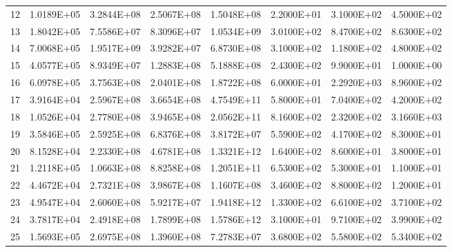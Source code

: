 \documentclass[11pt]{scrartcl}
\theoremstyle{dotlessP}
\theoremstyle{dotlessN}
\theoremstyle{dotN}
\begin{document}
\begin{table}[H]
{\begin{tabular}{c|c|c|c|c|c|c|c}
12            & 1.0189E+05  & 3.2844E+08      & 2.5067E+08    & 1.5048E+08          & 2.2000E+01         & 3.1000E+02       & 4.5000E+02             \\
13            & 1.8042E+05  & 7.5586E+07      & 8.3096E+07    & 1.0534E+09          & 3.0100E+02         & 8.4700E+02       & 8.6300E+02             \\
14            & 7.0068E+05  & 1.9517E+09      & 3.9282E+07    & 6.8730E+08          & 3.1000E+02         & 1.1800E+02       & 4.8000E+02             \\
15            & 4.0577E+05  & 8.9349E+07      & 1.2883E+08    & 5.1888E+08          & 2.4300E+02         & 9.9000E+01       & 1.0000E+00             \\
16            & 6.0978E+05  & 3.7563E+08      & 2.0401E+08    & 1.8722E+08          & 6.0000E+01         & 2.2920E+03       & 8.9600E+02             \\
17            & 3.9164E+04  & 2.5967E+08      & 3.6654E+08    & 4.7549E+11          & 5.8000E+01         & 7.0400E+02       & 4.2000E+02             \\
18            & 1.0526E+04  & 2.7780E+08      & 3.9465E+08    & 2.0562E+11          & 8.1600E+02         & 2.3200E+02       & 3.1660E+03             \\
19            & 3.5846E+05  & 2.5925E+08      & 6.8376E+08    & 3.8172E+07          & 5.5900E+02         & 4.1700E+02       & 8.3000E+01             \\
20            & 8.1528E+04  & 2.2330E+08      & 4.6781E+08    & 1.3321E+12          & 1.6400E+02         & 8.6000E+01       & 3.8000E+01             \\
21            & 1.2118E+05  & 1.0663E+08      & 8.8258E+08    & 1.2051E+11          & 6.5300E+02         & 5.3000E+01       & 1.1000E+01             \\
22            & 4.4672E+04  & 2.7321E+08      & 3.9867E+08    & 1.1607E+08          & 3.4600E+02         & 8.8000E+02       & 1.2000E+01             \\
23            & 4.9547E+04  & 2.6060E+08      & 5.9217E+07    & 1.9418E+12          & 1.3300E+02         & 6.6100E+02       & 3.7100E+02             \\
24            & 3.7817E+04  & 2.4918E+08      & 1.7899E+08    & 1.5786E+12          & 3.1000E+01         & 9.7100E+02       & 3.9900E+02             \\
25            & 1.5693E+05  & 2.6975E+08      & 1.3960E+08    & 7.2783E+07          & 3.6800E+02         & 5.5800E+02       & 5.3400E+02             \\

\end{tabular}}
\end{table}
\end{document}
